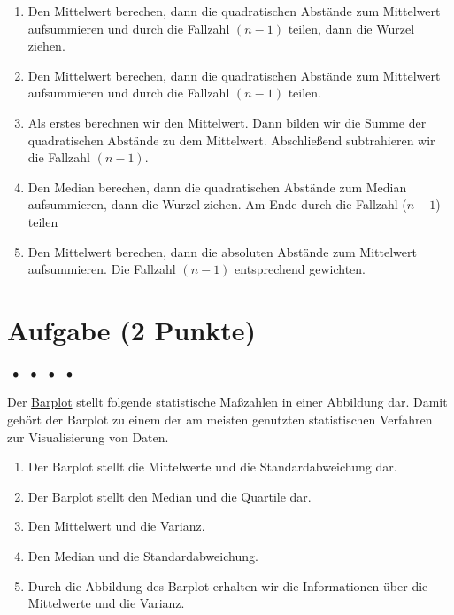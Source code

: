 \documentclass[a4paper, 9pt]{scrartcl}\usepackage[]{graphicx}\usepackage[]{xcolor}
\begin{document}
\begin{enumerate}
\item [\textbf{A} \msquare] Den Mittelwert berechen, dann die quadratischen Abstände zum Mittelwert aufsummieren und durch die Fallzahl $(n-1)$ teilen, dann die Wurzel ziehen.
\item [\textbf{B} \msquare] Den Mittelwert berechen, dann die quadratischen Abstände zum Mittelwert aufsummieren und durch die Fallzahl $(n-1)$ teilen.
\item [\textbf{C} \msquare] Als erstes berechnen wir den Mittelwert. Dann bilden wir die Summe der quadratischen Abstände zu dem Mittelwert. Abschließend subtrahieren wir die Fallzahl $(n-1)$.
\item [\textbf{D} \msquare] Den Median berechen, dann die quadratischen Abstände zum Median aufsummieren, dann die Wurzel ziehen. Am Ende durch die Fallzahl ($n-1$) teilen
\item [\textbf{E} \msquare] Den Mittelwert berechen, dann die absoluten Abstände zum Mittelwert aufsummieren. Die Fallzahl $(n-1)$ entsprechend gewichten.
\end{enumerate} 

\section{Aufgabe \hfill (2 Punkte)}

\ifcollection
\begin{flushright}
\tiny\vspace{-2Ex}
\textbf{\examinhaltstart}
\exammodulemathstat $\;\bullet$
\exammodulestat $\;\bullet$
\exammodulestatbbv $\;\bullet$
\exammodulestatversuch $\;\bullet$
\exammodulebiostat
\vspace{-1Ex}
\end{flushright}
\fi




Der \uline{Barplot} stellt folgende statistische Maßzahlen in einer Abbildung dar. Damit gehört der Barplot zu einem der am meisten genutzten statistischen Verfahren zur Visualisierung von Daten.

 



\begin{enumerate}
\item [\textbf{A} \msquare] Der Barplot stellt die Mittelwerte und die Standardabweichung dar.
\item [\textbf{B} \msquare] Der Barplot stellt den Median und die Quartile dar.
\item [\textbf{C} \msquare] Den Mittelwert und die Varianz.
\item [\textbf{D} \msquare] Den Median und die Standardabweichung.
\item [\textbf{E} \msquare] Durch die Abbildung des Barplot erhalten wir die Informationen über die Mittelwerte und die Varianz.
\end{enumerate}
\end{document}
